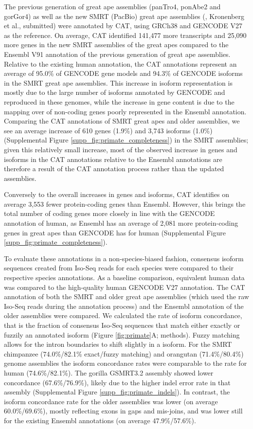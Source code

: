 \documentclass[fleqn,10pt]{wlscirep}
\begin{document}
The previous generation of great ape assemblies (panTro4, ponAbe2 and gorGor4) as well as the new SMRT (PacBio) great ape assemblies (\citealt{gordon2016long}, Kronenberg et al., submitted) were annotated by CAT, using GRCh38 and GENCODE V27 as the reference. On average, CAT identified 141,477 more transcripts and 25,090 more genes in the new SMRT assemblies of the great apes compared to the Ensembl V91 annotation of the previous generation of great ape assemblies. Relative to the existing human annotation, the CAT annotations represent an average of 95.0\% of GENCODE gene models and 94.3\% of GENCODE isoforms in the SMRT great ape assemblies. This increase in isoform representation is mostly due to the large number of isoforms annotated by GENCODE and reproduced in these genomes, while the increase in gene content is due to the mapping over of non-coding genes poorly represented in the Ensembl annotation. Comparing the CAT annotations of SMRT great apes and older assemblies, we see an average increase of 610 genes (1.9\%) and 3,743 isoforms (1.0\%) (Supplemental Figure \ref{supp_fig:primate_completeness}) in the SMRT assemblies; given this relatively small increase, most of the observed increase in genes and isoforms in the CAT annotations relative to the Ensembl annotations are therefore a result of the CAT annotation process rather than the updated assemblies.

Conversely to the overall increases in genes and isoforms, CAT identifies on average 3,553 fewer protein-coding genes than Ensembl. However, this brings the total number of coding genes more closely in line with the GENCODE annotation of human, as Ensembl has an average of 2,081 more protein-coding genes in great apes than GENCODE has for human (Supplemental Figure \ref{supp_fig:primate_completeness}). 

To evaluate these annotations in a non-species-biased fashion, consensus isoform sequences created from Iso-Seq reads for each species were compared to their respective species annotations. As a baseline comparison, equivalent human data was compared to the high-quality human GENCODE V27 annotation. The CAT annotation of both the SMRT and older great ape assemblies (which used the raw Iso-Seq reads during the annotation process) and the Ensembl annotation of the older assemblies were compared. We calculated the rate of isoform concordance, that is the fraction of consensus Iso-Seq sequences that match either exactly or fuzzily an annotated isoform (Figure \ref{fig:primate}A; methods). Fuzzy matching allows for the intron boundaries to shift slightly in a isoform. For the SMRT chimpanzee (74.0\%/82.1\% exact/fuzzy matching) and orangutan (71.4\%/80.4\%) genome assemblies the isoform concordance rates were comparable to the rate for human (74.6\%/82.1\%). The gorilla GSMRT3.2 assembly showed lower concordance (67.6\%/76.9\%), likely due to the higher indel error rate in that assembly (Supplemental Figure \ref{supp_fig:primate_indels}). In contrast, the isoform concordance rate for the older assemblies was lower (on average 60.0\%/69.6\%), mostly reflecting exons in gaps and mis-joins, and was lower still for the existing Ensembl annotations (on average 47.9\%/57.6\%).
\end{document}
